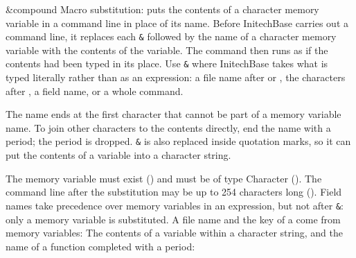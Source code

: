 \begin{XbaseEntry}{\&}{compound}\XAlso{&}{\&}%
Macro substitution: puts the contents of a character memory variable in a
command line in place of its name.
\Syntax
{}
\Usage
Before InitechBase carries out a command line, it replaces each \texttt{\&}
followed by the name of a character memory variable with the contents of the
variable.  The command then runs as if the contents had been typed in its
place.  Use \texttt{\&} where InitechBase takes what is typed literally rather
than as an expression: a file name after  or , the
characters after , a field name, or a whole command.

The name ends at the first character that cannot be part of a memory variable
name.  To join other characters to the contents directly, end the name with a
period; the period is dropped.  \texttt{\&} is also replaced inside quotation
marks, so it can put the contents of a variable into a character string.

The memory variable must exist () and must be of
type Character ().  The command line after the
substitution may be up to 254 characters long
().
\Tips
Field names take precedence over memory variables in an expression, but not
after \texttt{\&}: only a memory variable is substituted.
\Examples
A file name and the key of a  come from memory variables:
The contents of a variable within a character string, and the name of a
function completed with a period:
\end{XbaseEntry}

